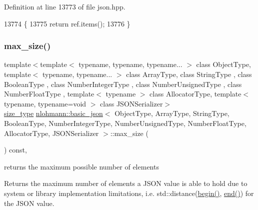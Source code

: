 Definition at line 13773 of file json.\+hpp.


\begin{DoxyCode}
13774     \{
13775         \textcolor{keywordflow}{return} ref.items();
13776     \}
\end{DoxyCode}
\mbox{\label{classnlohmann_1_1basic__json_a2f47d3c6a441c57dd2be00449fbb88e1}} 
\subsubsection{\texorpdfstring{max\+\_\+size()}{max\_size()}}
{\footnotesize\ttfamily template$<$template$<$ typename, typename, typename... $>$ class Object\+Type, template$<$ typename, typename... $>$ class Array\+Type, class String\+Type , class Boolean\+Type , class Number\+Integer\+Type , class Number\+Unsigned\+Type , class Number\+Float\+Type , template$<$ typename $>$ class Allocator\+Type, template$<$ typename, typename=void $>$ class J\+S\+O\+N\+Serializer$>$ \\
\hyperlink{classnlohmann_1_1basic__json_a39f2cd0b58106097e0e67bf185cc519b}{size\+\_\+type} \hyperlink{classnlohmann_1_1basic__json}{nlohmann\+::basic\+\_\+json}$<$ Object\+Type, Array\+Type, String\+Type, Boolean\+Type, Number\+Integer\+Type, Number\+Unsigned\+Type, Number\+Float\+Type, Allocator\+Type, J\+S\+O\+N\+Serializer $>$\+::max\+\_\+size (\begin{DoxyParamCaption}{ }\end{DoxyParamCaption}) const\hspace{0.3cm}{\ttfamily [inline]}, {\ttfamily [noexcept]}}



returns the maximum possible number of elements 

Returns the maximum number of elements a J\+S\+ON value is able to hold due to system or library implementation limitations, i.\+e. {\ttfamily std\+::distance(\hyperlink{classnlohmann_1_1basic__json_a0ff28dac23f2bdecee9564d07f51dcdc}{begin()}, \hyperlink{classnlohmann_1_1basic__json_a13e032a02a7fd8a93fdddc2fcbc4763c}{end()})} for the J\+S\+ON value.

